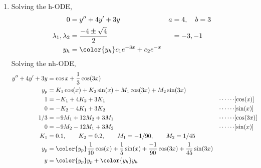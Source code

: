 \begin{enumerate}
    \item Solving the h-ODE,
          \begin{align}
              0                        & = y'' + 4y' + 3y                         &
              a                        & = 4, \quad b = 3                           \\
              \lambda_{1}, \lambda_{2} & = \frac{-4 \pm \sqrt{4}}{2}              &
                                       & = -3, -1                                   \\
              y_{h}                    & = \color{y_h} c_{1}e^{-3x} + c_{2}e^{-x}
          \end{align}
          Solving the nh-ODE,
          \begin{align}
              y'' + 4y' + 3y & = \cos x + \frac{1}{3}\cos(3x)                     \\
              y_{p}          & = K_{1} \cos(x) + K_{2} \sin(x) + M_{1}\cos(3x)
              + M_{2}\sin(3x)                                                     \\
              1              & = -K_{1} + 4K_{2} + 3K_{1}                       &
              \cdots\cdots   & [\cos(x)]                                          \\
              0              & = -K_{2} - 4K_{1} + 3K_{2}                       &
              \cdots\cdots   & [\sin(x)]                                          \\
              1/3            & = -9M_{1} + 12M_{2} + 3M_{1}                     &
              \cdots\cdots   & [\cos(3x)]                                         \\
              0              & = -9M_{2} - 12M_{1} + 3M_{2}                     &
              \cdots\cdots   & [\sin(x)]                                          \\
              K_{1}          & = 0.1, \qquad K_{2} = 0.2, \qquad M_{1} = -1/90
              , \qquad M_{2} = 1/45                                               \\
              y_{p}          & = \color{y_p} \frac{1}{10} \cos(x) + \frac{1}{5}
              \sin(x) +
              \frac{-1}{90}\cos(3x) + \frac{1}{45}\sin(3x)                        \\
              y              & = {\color{y_p} y_{p}} + {\color{y_h} y_{h}}
          \end{align}


\end{enumerate}
